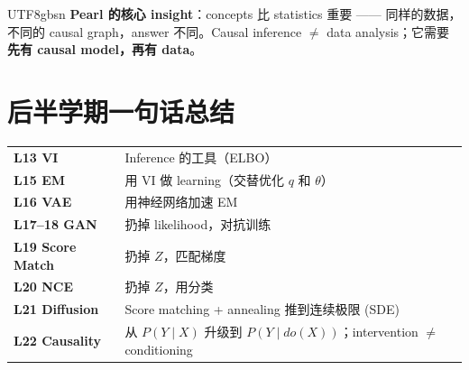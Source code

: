 \documentclass[11pt]{article}
\begin{document}
\begin{CJK}{UTF8}{gbsn}
\textbf{Pearl 的核心 insight}：concepts 比 statistics 重要 —— 同样的数据，不同的 causal graph，answer 不同。Causal inference $\neq$ data analysis；它需要\textbf{先有 causal model，再有 data}。

\section*{后半学期一句话总结}

\begin{center}
\begin{tabular}{l|l}
  \textbf{L13 VI} & Inference 的工具（ELBO） \\
  \textbf{L15 EM} & 用 VI 做 learning（交替优化 $q$ 和 $\theta$） \\
  \textbf{L16 VAE} & 用神经网络加速 EM \\
  \textbf{L17--18 GAN} & 扔掉 likelihood，对抗训练 \\
  \textbf{L19 Score Match} & 扔掉 $Z$，匹配梯度 \\
  \textbf{L20 NCE} & 扔掉 $Z$，用分类 \\
  \textbf{L21 Diffusion} & Score matching + annealing 推到连续极限 (SDE) \\
  \textbf{L22 Causality} & 从 $P(Y\mid X)$ 升级到 $P(Y\mid do(X))$；intervention $\neq$ conditioning \\
\end{tabular}
\end{center}

\end{CJK}
\end{document}

